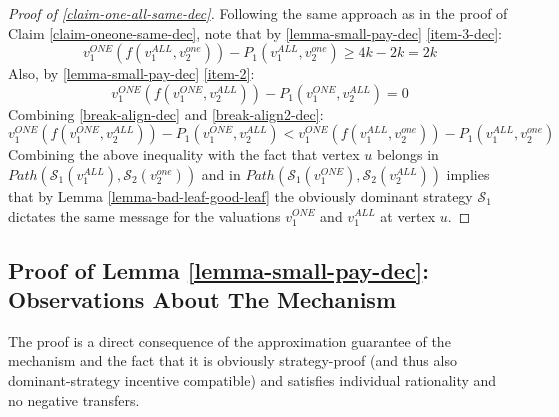 \begin{proof}[Proof of \cref{claim-one-all-same-dec}]
    Following the same approach as in the proof of Claim \ref{claim-oneone-same-dec}, note that by \cref{lemma-small-pay-dec}  \cref{item-3-dec}: 
\begin{equation}\label{break-align-dec}
v_1^{ONE}(f(v_1^{ALL},v_2^{one}))-P_1(v_1^{ALL},v_2^{one}) \ge 4k-2k=2k     
\end{equation}
Also, by \cref{lemma-small-pay-dec}  \cref{item-2}:
\begin{equation}\label{break-align2-dec}
  v_1^{ONE}(f(v_1^{ONE},v_2^{ALL}))  
-P_1(v_1^{ONE},v_2^{ALL})=0   
\end{equation}
Combining \cref{break-align-dec} and \cref{break-align2-dec}:
\begin{equation*}
    v_1^{ONE}(f(v_1^{ONE},v_2^{ALL}))  
-P_1(v_1^{ONE},v_2^{ALL})< v_1^{ONE}(f(v_1^{ALL},v_2^{one}))-P_1(v_1^{ALL},v_2^{one})
\end{equation*}
Combining the above inequality with the fact that 
vertex $u$ belongs in $Path(\mathcal S_1(v_1^{ALL}),\mathcal S_2(v_2^{one}))$ and in
$Path(\mathcal{S}_1(v_1^{ONE}),\mathcal{S}_2(v_2^{ALL}))$ implies that by Lemma \ref{lemma-bad-leaf-good-leaf} 
the obviously dominant strategy $\mathcal S_1$ dictates the same message for the valuations $v_1^{ONE}$ and $v_1^{ALL}$ at vertex $u$. 
\end{proof}


\subsection{Proof of Lemma \ref{lemma-small-pay-dec}: Observations About The Mechanism}\label{sec-small-pay-proof-alltogether-dec}
The proof is a direct consequence of the approximation guarantee of the mechanism and the fact that it is 
obviously strategy-proof (and thus also dominant-strategy incentive compatible) and satisfies individual rationality and no negative transfers. 




